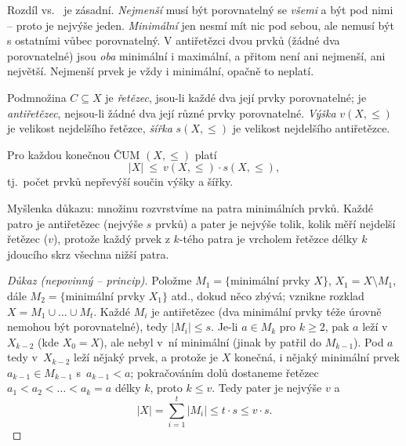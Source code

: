 \documentclass[11pt,a4paper]{article}
\begin{document}
\begin{intuice}
Rozdíl  vs.\  je zásadní. \emph{Nejmenší} musí být porovnatelný se \emph{všemi} a být pod nimi -- proto je nejvýše jeden. \emph{Minimální} jen nesmí mít nic pod sebou, ale nemusí být s ostatními vůbec porovnatelný. V antiřetězci dvou prvků (žádné dva porovnatelné) jsou \emph{oba} minimální i maximální, a přitom není ani nejmenší, ani největší. Nejmenší prvek je vždy i minimální, opačně to neplatí.
\end{intuice}

\begin{definice}
Podmnožina $C\subseteq X$ je \emph{řetězec}, jsou-li každé dva její prvky porovnatelné; je \emph{antiřetězec}, nejsou-li žádné dva její různé prvky porovnatelné. \emph{Výška} $v(X,\le)$ je velikost nejdelšího řetězce, \emph{šířka} $s(X,\le)$ je velikost nejdelšího antiřetězce.
\end{definice}

\begin{veta}
Pro každou konečnou ČUM $(X,\le)$ platí
\[
|X|\ \le\ v(X,\le)\cdot s(X,\le),
\]
tj.\ počet prvků nepřevýší součin výšky a šířky.
\end{veta}

\begin{intuice}
 Myšlenka důkazu: množinu rozvrstvíme na patra minimálních prvků. Každé patro je antiřetězec (nejvýše $s$ prvků) a pater je nejvýše tolik, kolik měří nejdelší řetězec ($v$), protože každý prvek z $k$-tého patra je vrcholem řetězce délky $k$ jdoucího skrz všechna nižší patra.
\end{intuice}

\begin{proof}[Důkaz \textnormal{(nepovinný -- princip)}]
Položme $M_1=\{$minimální prvky $X\}$, $X_1=X\setminus M_1$, dále $M_2=\{$minimální prvky $X_1\}$ atd., dokud něco zbývá; vznikne rozklad $X=M_1\cup\dots\cup M_t$. Každé $M_i$ je antiřetězec (dva minimální prvky téže úrovně nemohou být porovnatelné), tedy $|M_i|\le s$. Je-li $a\in M_k$ pro $k\ge2$, pak $a$ leží v~$X_{k-2}$ (kde $X_0=X$), ale nebyl v~ní minimální (jinak by patřil do $M_{k-1}$). Pod $a$ tedy v~$X_{k-2}$ leží nějaký prvek, a protože je $X$ konečná, i nějaký minimální prvek $a_{k-1}\in M_{k-1}$ s~$a_{k-1}<a$; pokračováním dolů dostaneme řetězec $a_1<a_2<\dots<a_k=a$ délky $k$, proto $k\le v$. Tedy pater je nejvýše $v$ a
\[
|X|=\sum_{i=1}^{t}|M_i|\le t\cdot s\le v\cdot s.
\]
\end{proof}
\end{document}
